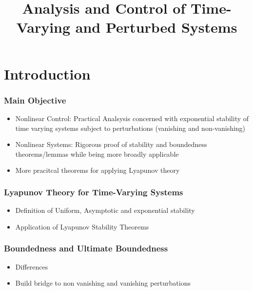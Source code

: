\documentclass[student, noshadow, lsr, english, aspectratio=169, t]{ITR_LSR_slides}
\title{Analysis and Control of Time-Varying and Perturbed Systems}
\begin{document}
\begin{frame}
    \titlepage
\end{frame}


\section{Introduction}

\begin{frame}
	\frametitle{Main Objective}
	\begin{itemize}
		\item Nonlinear Control: Practical Analsysis concerned with exponential stability of time varying systems subject to perturbations (vanishing and non-vanishing)
		\item Nonlinear Systems: Rigorous proof of stability and boundedness theorems/lemmas while being more broadly applicable
		\item More pracitcal theorems for applying Lyapunov theory
	\end{itemize}
\end{frame}

\begin{frame}
	\frametitle{Lyapunov Theory for Time-Varying Systems}
	\begin{itemize}
		\item Definition of Uniform, Asymptotic and exponential stability \cite{muennighoff_s1_2025}
		\item Application of Lyapunov Stability Theorems
	\end{itemize}
\end{frame}

\begin{frame}
	\frametitle{Boundedness and Ultimate Boundedness}
	\begin{itemize}
		\item Differences
		\item Build bridge to non vanishing and vanishing perturbations
	\end{itemize}
\end{frame}

\end{document}
